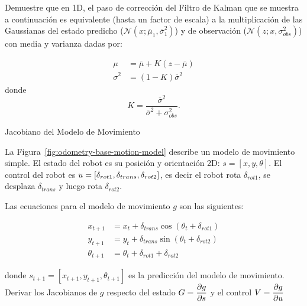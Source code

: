 \documentclass[tp]{lcc}
\begin{document}
    Demuestre que en 1D, el paso de corrección del Filtro de Kalman que se muestra a continuación es equivalente (hasta un factor de escala) a la multiplicación de las Gaussianas del estado predicho ($\mathcal{N}(x;\overline{\mu}_{1},\overline{\sigma}_{1}^{2})$) y de observación ($\mathcal{N}(z;x, \sigma_{obs}^{2})$) con media y varianza dadas por:
    
    \begin{align*}
        \mu &= \overline{\mu} + K (z - \overline{\mu})\\
        \sigma^{2} &= (1 - K) \overline{\sigma}^{2}
    \end{align*}
%
    donde 
    \begin{equation*}
        K = \dfrac{\overline{\sigma}^{2}}{\overline{\sigma}^{2}+\sigma_{obs}^{2}}.
    \end{equation*}
	
	\ejercicio Jacobiano del Modelo de Movimiento
    \label{exercise:jacobian}
    
    La Figura~\ref{fig:odometry-base-motion-model} describe un modelo de movimiento simple. El estado del robot es su posición y orientación 2D: $s = [x, y, \theta]$. El control del robot es $u = [\delta_{rot1}, \delta_{trans}, \delta_{rot2}]$, es decir el robot rota $\delta_{rot1}$, se desplaza $\delta_{trans}$ y luego rota $\delta_{rot2}$.
    
    Las ecuaciones para el modelo de movimiento $g$ son las siguientes:
    
    \begin{align*}
        x_{t+1} &= x_{t} + \delta_{trans} \cos(\theta_{t} + \delta_{rot1})\\
        y_{t+1} &= y_{t} + \delta_{trans} \sin(\theta_{t} + \delta_{rot2})\\
        \theta_{t+1} &= \theta_{t} + \delta_{rot1} + \delta_{rot2}
    \end{align*}

    donde $s_{t+1} = [x_{t+1}, y_{t+1}, \theta_{t+1}]$ es la predicción del modelo de movimiento. Derivar los Jacobianos de $g$ respecto del estado $G = \dfrac{\partial g}{\partial s}$ y el control $V = \dfrac{\partial g}{\partial u}$
    
\end{document}
